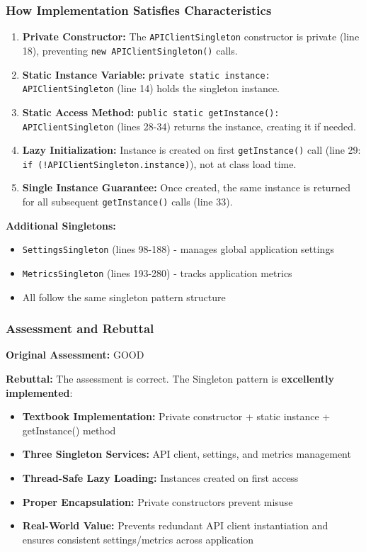 \documentclass[11pt]{article}
\begin{document}
\subsubsection{How Implementation Satisfies Characteristics}

\begin{enumerate}[noitemsep]
    \item \textbf{Private Constructor:} The \texttt{APIClientSingleton} constructor is private (line 18), preventing \texttt{new APIClientSingleton()} calls.

    \item \textbf{Static Instance Variable:} \texttt{private static instance: APIClientSingleton} (line 14) holds the singleton instance.

    \item \textbf{Static Access Method:} \texttt{public static getInstance(): APIClientSingleton} (lines 28-34) returns the instance, creating it if needed.

    \item \textbf{Lazy Initialization:} Instance is created on first \texttt{getInstance()} call (line 29: \texttt{if (!APIClientSingleton.instance)}), not at class load time.

    \item \textbf{Single Instance Guarantee:} Once created, the same instance is returned for all subsequent \texttt{getInstance()} calls (line 33).
\end{enumerate}

\textbf{Additional Singletons:}
\begin{itemize}[noitemsep]
    \item \texttt{SettingsSingleton} (lines 98-188) - manages global application settings
    \item \texttt{MetricsSingleton} (lines 193-280) - tracks application metrics
    \item All follow the same singleton pattern structure
\end{itemize}

\subsubsection{Assessment and Rebuttal}
\textbf{Original Assessment:} GOOD

\textbf{Rebuttal:} The assessment is correct. The Singleton pattern is \textbf{excellently implemented}:

\begin{itemize}[noitemsep]
    \item \textbf{Textbook Implementation:} Private constructor + static instance + getInstance() method
    \item \textbf{Three Singleton Services:} API client, settings, and metrics management
    \item \textbf{Thread-Safe Lazy Loading:} Instances created on first access
    \item \textbf{Proper Encapsulation:} Private constructors prevent misuse
    \item \textbf{Real-World Value:} Prevents redundant API client instantiation and ensures consistent settings/metrics across application
\end{itemize}
\end{document}
